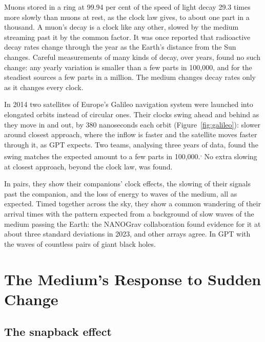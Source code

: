 \documentclass[11pt,a4paper]{article}
\begin{document}
 Muons stored in a ring at 99.94 per cent of the speed of light decay 29.3 times more slowly than muons at rest, as the clock law gives, to about one part in a thousand. A muon's decay is a clock like any other, slowed by the medium streaming past it by the common factor. It was once reported that radioactive decay rates change through the year as the Earth's distance from the Sun changes. Careful measurements of many kinds of decay, over years, found no such change: any yearly variation is smaller than a few parts in 100,000, and for the steadiest sources a few parts in a million. The medium changes decay rates only as it changes every clock.

 In 2014 two satellites of Europe's Galileo navigation system were launched into elongated orbits instead of circular ones. Their clocks swing ahead and behind as they move in and out, by 380 nanoseconds each orbit (Figure~\ref{fig:galileo}): slower around closest approach, where the inflow is faster and the satellite moves faster through it, as GPT expects. Two teams, analysing three years of data, found the swing matches the expected amount to a few parts in 100,000.\textsuperscript{,} No extra slowing at closest approach, beyond the clock law, was found.

 In pairs, they show their companions' clock effects, the slowing of their signals past the companion, and the loss of energy to waves of the medium, all as expected. Timed together across the sky, they show a common wandering of their arrival times with the pattern expected from a background of slow waves of the medium passing the Earth: the NANOGrav collaboration found evidence for it at about three standard deviations in 2023, and other arrays agree. In GPT  with the waves of countless pairs of giant black holes.

\section{The Medium's Response to Sudden Change}

\subsection{The snapback effect}
\end{document}
